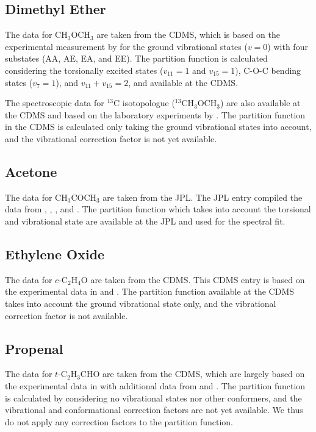\documentclass[twocolumn, twocolappendix, astrosymb, times]{aastex631}
\newcommand{\dimethylether}{CH$_3$OCH$_3$\xspace}
\newcommand{\acetone}{CH$_3$COCH$_3$\xspace}
\newcommand{\ethyleneoxide}{$c$-C$_2$H$_4$O\xspace}
\newcommand{\propenal}{$t$-C$_2$H$_3$CHO\xspace}
\begin{document}
\subsection{Dimethyl Ether}
The data for \dimethylether are taken from the CDMS, which is based on the experimental measurement by \citet{Endres2009} for the ground vibrational states ($v = 0$) with four substates (AA, AE, EA, and EE). The partition function is calculated considering the torsionally excited states ($v_{11} = 1$ and $v_{15} = 1$), C-O-C bending states ($v_7 = 1$), and $v_{11} + v_{15} = 2$, and available at the CDMS. 

The spectroscopic data for $^{13}$C isotopologue ($^{13}$\dimethylether) are also available at the CDMS and based on the laboratory experiments by \citet{Koerber2013}. The partition function in the CDMS is calculated only taking the ground vibrational states into account, and the vibrational correction factor is not yet available.   

\subsection{Acetone}
The data for \acetone are taken from the JPL. The JPL entry compiled the data from \citet{Peter1965}, \citet{Vacherand1986}, \citet{Oldag1992}, and \citet{Groder2002}. The partition function which takes into account the torsional and vibrational state are available at the JPL and used for the spectral fit. 

\subsection{Ethylene Oxide}
The data for \ethyleneoxide are taken from the CDMS. This CDMS entry is based on the experimental data in \citet{Creswell1974} and \citet{Muller2022}. The partition function available at the CDMS takes into account the ground vibrational state only, and the vibrational correction factor is not available.

\subsection{Propenal}
The data for \propenal are taken from the CDMS, which are largely based on the experimental data in \citet{Daly2015} with additional data from \citet{Winnewisser1975} and \citet{Cherniak1966}. The partition function is calculated by considering no vibrational states nor other conformers, and the vibrational and conformational correction factors are not yet available. We thus do not apply any correction factors to the partition function.
\end{document}
